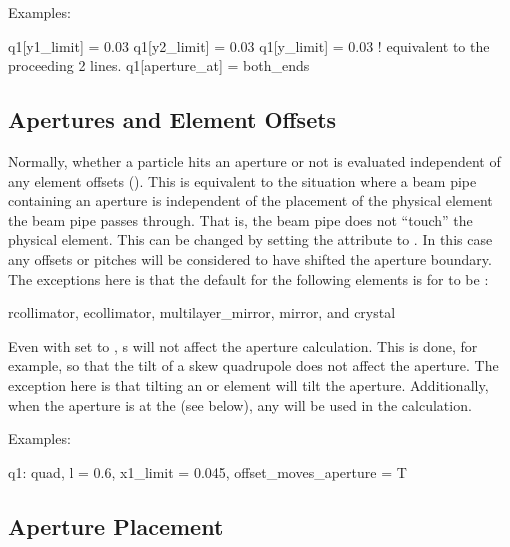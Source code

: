 Examples:
\begin{example}
  q1[y1_limit] = 0.03
  q1[y2_limit] = 0.03
  q1[y_limit] = 0.03  ! equivalent to the proceeding 2 lines.  
  q1[aperture_at] = both_ends
\end{example}

\subsection{Apertures and Element Offsets}

Normally, whether a particle hits an aperture or not is evaluated
independent of any element offsets (). This is
equivalent to the situation where a beam pipe containing an aperture
is independent of the placement of the physical element the beam pipe
passes through. That is, the beam pipe does not ``touch'' the physical
element. This can be changed by setting the 
attribute to . In this case any offsets or pitches will be
considered to have shifted the aperture boundary. The exceptions here
is that the default for the following elements is for
 to be :
\begin{example}
  rcollimator, 
  ecollimator,
  multilayer_mirror, 
  mirror, and 
  crystal 
\end{example}

Even with  set to , s will
not affect the aperture calculation. This is done, for example, so
that the tilt of a skew quadrupole does not affect the aperture. The
exception here is that tilting an  or 
element will tilt the aperture. Additionally, when the aperture is at
the  (see below), any  will be used in the
calculation.

Examples:
\begin{example}
  q1: quad, l = 0.6, x1_limit = 0.045, offset_moves_aperture = T
\end{example}

\subsection{Aperture Placement}

